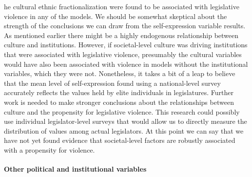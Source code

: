 \documentclass[a4paper]{article}\usepackage[]{graphicx}\usepackage[]{color}
\begin{document}
he cultural  ethnic fractionalization were  found to be associated with legislative violence in any of the models.   We should be somewhat skeptical about the strength of the conclusions we can draw from the self-expression variable results. As mentioned earlier there might be a highly endogenous relationship between culture and institutions. However, if societal-level culture was driving institutions that were associated with legislative violence, presumably the cultural variables would have also been associated with violence in models without the institutional variables, which they were not. Nonetheless, it takes a bit of a leap to believe that the mean level of self-expression found using a national-level survey accurately reflects the values held by elite individuals in legislatures. Further work is needed to make stronger conclusions about the relationships between culture and the propensity for legislative violence. This research could possibly use individual legislator-level surveys that would allow us to directly measure the distribution of values among actual legislators.  At this point we can say that we have not yet found evidence that societal-level factors are robustly  associated with a propensity for violence.

\paragraph{Other political and institutional variables}
\end{document}
